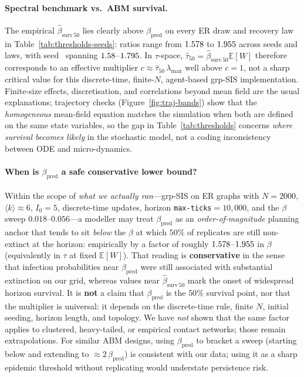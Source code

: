 \documentclass[11pt,a4paper]{article}
\begin{document}
\paragraph{Spectral benchmark vs.\ ABM survival.}
The empirical $\hat{\beta}_{\mathrm{surv}\,50}$ lies clearly above $\beta_{\mathrm{pred}}$ on every ER draw and recovery law in Table~\ref{tab:thresholds-seeds}: ratios range from $1.578$ to $1.955$ across seeds and laws, with seed~\RepPrimarySeed{} spanning $1.58$--$1.795$. In $\tau$-space, $\hat{\tau}_{50}=\hat{\beta}_{\mathrm{surv}\,50}\mathbb{E}[W]$ therefore corresponds to an effective multiplier $c\approx \hat{\tau}_{50}\,\lambda_{\max}$ well above $c{=}1$, not a sharp critical value for this discrete-time, finite-$N$, agent-based grp-SIS implementation. Finite-size effects, discretisation, and correlations beyond mean field are the usual explanations; trajectory checks (Figure~\ref{fig:traj-bands}) show that the \emph{homogeneous} mean-field equation matches the simulation when both are defined on the same state variables, so the gap in Table~\ref{tab:thresholds} concerns \emph{where survival becomes likely} in the stochastic model, not a coding inconsistency between ODE and micro-dynamics.

\paragraph{When is $\beta_{\mathrm{pred}}$ a safe conservative lower bound?}
Within the scope of \emph{what we actually ran}---grp-SIS on ER graphs with $N{=}2000$, $\langle k\rangle\approx 6$, $I_0{=}5$, discrete-time updates, horizon \texttt{max-ticks}${}=10{,}000$, and the $\beta$ sweep $0.018$--$0.056$---a modeller may treat $\beta_{\mathrm{pred}}$ as an \emph{order-of-magnitude} planning anchor that tends to sit \emph{below} the $\beta$ at which $50\%$ of replicates are still non-extinct at the horizon: empirically by a factor of roughly $1.578$--$1.955$ in $\beta$ (equivalently in $\tau$ at fixed $\mathbb{E}[W]$). That reading is \textbf{conservative} in the sense that infection probabilities near $\beta_{\mathrm{pred}}$ were still associated with substantial extinction on our grid, whereas values near $\hat{\beta}_{\mathrm{surv}\,50}$ mark the onset of widespread horizon survival. It is \textbf{not} a claim that $\beta_{\mathrm{pred}}$ is the $50\%$ survival point, nor that the multiplier is universal: it depends on the discrete-time rule, finite $N$, initial seeding, horizon length, and topology. We have \emph{not} shown that the same factor applies to clustered, heavy-tailed, or empirical contact networks; those remain extrapolations. For similar ABM designs, using $\beta_{\mathrm{pred}}$ to bracket a sweep (starting below and extending to $\approx 2\,\beta_{\mathrm{pred}}$) is consistent with our data; using it as a sharp epidemic threshold without replicating would understate persistence risk.
\end{document}
